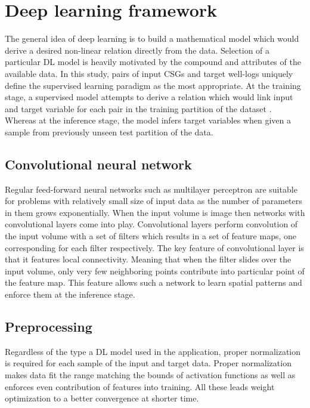 \documentclass[manuscript]{geophysics}
\begin{document}
\section{Deep learning framework}
The general idea of deep learning is to build a mathematical model which would derive a desired non-linear relation directly from the data. Selection of a particular DL model is heavily motivated by the compound and attributes of the available data. 
In this study,  pairs of input CSGs and target well-logs  uniquely define the supervised learning paradigm as the most appropriate. At the training stage, a supervised model attempts to derive a relation which would link input and target variable for each pair in the training partition of the dataset . Whereas at the inference stage, the model infers target variables when given a sample from previously unseen test partition of the data.


\subsection{Convolutional neural network}
Regular feed-forward neural networks such as multilayer perceptron are suitable for problems with relatively small size of input data as the number of parameters in them grows exponentially. When the input volume is image then networks with convolutional layers come into play. Convolutional layers perform convolution of the input volume with a set of filters which results in a set of feature maps, one corresponding for each filter respectively. The key feature of convolutional layer is that it features local connectivity. Meaning that when the filter slides over the input volume, only very few neighboring points contribute into particular point of the feature map. This feature allows such a network to learn spatial patterns and enforce them at the inference stage.

\subsection{Preprocessing}
Regardless of the type a DL model used in the application, proper normalization is required for each sample of the input and target data. Proper normalization makes data fit the range matching the bounds of activation functions as well as enforces even contribution of features into training. All these leads weight optimization to a better convergence at shorter time.
\end{document}
